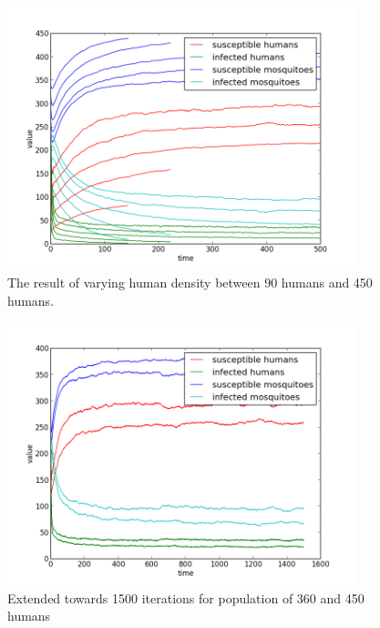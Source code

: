\documentclass[a4paper]{report}
\begin{document}
\begin{figure}[htbp]
    \centering
    \includegraphics[width=0.9\textwidth]{var_human_density_02_05_08.png}
    \caption{The result of varying human density between 90 humans and 450 humans.}
    \label{fig:var_human}
\end{figure}


\begin{figure}[htbp]
    \centering
    \includegraphics[width=0.9\textwidth]{var_human_1500.png}
    \caption{Extended towards 1500 iterations for population of 360 and 450
    humans}
    \label{fig:var_human_1500}
\end{figure}

\end{document}
